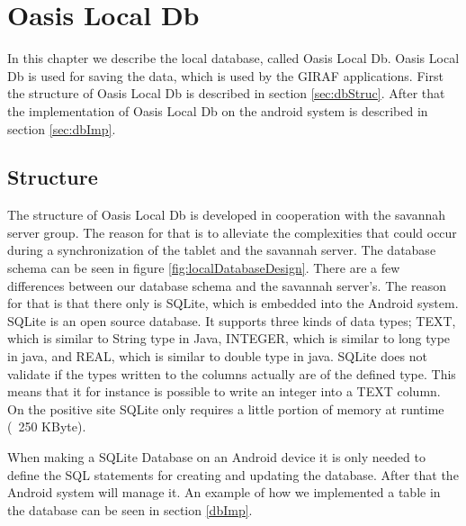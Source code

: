 \chapter{Oasis Local Db}
\label{ch:Db}
In this chapter we describe the local database, called Oasis Local Db. Oasis Local Db is used for saving the data, which is used by the GIRAF applications. First the structure of Oasis Local Db is described in section \vref{sec:dbStruc}. After that the implementation of Oasis Local Db on the android system is described in section \vref{sec:dbImp}.

\section{Structure}
\label{sec:dbStruc}
The structure of Oasis Local Db is developed in cooperation with the savannah server group. The reason for that is to alleviate the complexities that could occur during a synchronization of the tablet and the savannah server. The database schema can be seen in figure \autoref{fig:localDatabaseDesign}. There are a few differences between our database schema and the savannah server's. The reason for that is that there only is SQLite, which is embedded into the Android system. SQLite is an open source database. It supports three kinds of data types; TEXT, which is similar to String type in Java, INTEGER, which is similar to long type in java, and REAL, which is similar to double type in java. SQLite does not validate if the types written to the columns actually are of the defined type. This means that it for instance is possible to write an integer into a TEXT column. On the positive site SQLite only requires a little portion of memory at runtime (~250 KByte).

When making a SQLite Database on an Android device it is only needed to define the SQL statements for creating and updating the database. After that the Android system will manage it. An example of how we implemented a table in the database can be seen in section \vref{dbImp}.

